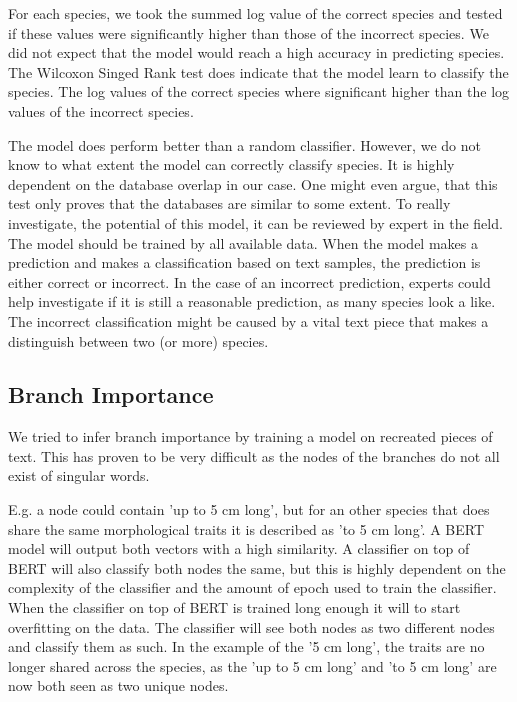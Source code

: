 \documentclass[a4paper, 12pt, oneside]{book} %
\begin{document}
For each species, we took the summed log value of the correct species and tested if these values were significantly higher than those of the incorrect species.
We did not expect that the model would reach a high accuracy in predicting species.
The Wilcoxon Singed Rank test does indicate that the model learn to classify the species.
The log values of the correct species where significant higher than the log values of the incorrect species.

The model does perform better than a random classifier.
However, we do not know to what extent the model can correctly classify species.
It is highly dependent on the database overlap in our case.
One might even argue, that this test only proves that the databases are similar to some extent.
To really investigate, the potential of this model, it can be reviewed by expert in the field.
The model should be trained by all available data. 
When the model makes a prediction and makes a classification based on text samples, the prediction is either correct or incorrect.
In the case of an incorrect prediction, experts could help investigate if it is still a reasonable prediction, as many species look a like.
The incorrect classification might be caused by a vital text piece that makes a distinguish between two (or more) species.







\subsection{Branch Importance}
We tried to infer branch importance by training a model on recreated pieces of text.
This has proven to be very difficult as the nodes of the branches do not all exist of singular words.

E.g. a node could contain 'up to 5 cm long', but for an other species that does share the same morphological traits it is described as 'to 5 cm long'.
A BERT model will output both vectors with a high similarity.
A classifier on top of BERT will also classify both nodes the same, but this is highly dependent on the complexity of the classifier and the amount of epoch used to train the classifier.
When the classifier on top of BERT is trained long enough it will to start overfitting on the data.
The classifier will see both nodes as two different nodes and classify them as such.
In the example of the '5 cm long', the traits are no longer shared across the species, as the 'up to 5 cm long' and 'to 5 cm long' are now both seen as two unique nodes.
\end{document}
